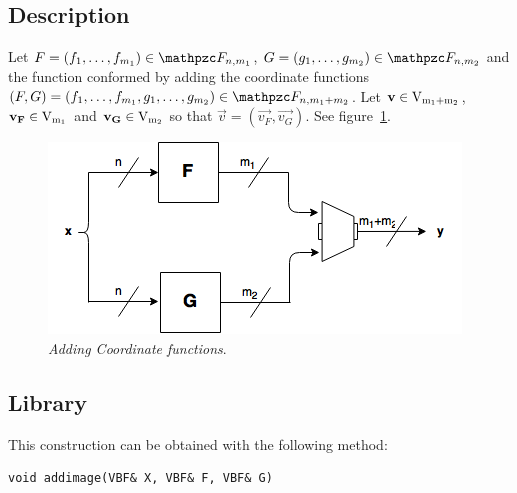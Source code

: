 \subsection{Description}

\begin{definition}
Let $F=(f_1,\ldots,f_{m_1}) \in \funct{F}_{n,m_1}$, $G=(g_1,\ldots,g_{m_2}) \in \funct{F}_{n,m_2}$ and the function conformed by adding the coordinate functions $(F,G) =(f_1,\dots,f_{m_1},g_1,\ldots,g_{m_2}) \in \funct{F}_{n,m_1+m_2}$. Let $\vec{v} \in \gf{V_{m_1+m_2}}$,$\vec{v_F} \in \gf{V_{m_1}}$ and $\vec{v_G} \in \gf{V_{m_2}}$ so that $\vec{v} = (\vec{v_F}, \vec{v_G})$. See figure~\ref{fig:AddImage}.
\end{definition}

\begin{figure}[htbp!]
\centering
\includegraphics{AddImage}
\caption[Adding Coordinate functions]{\textit{Adding Coordinate functions}.}
\label{fig:AddImage}
\end{figure}

\subsection{Library}

This construction can be obtained with the following method:

\begin{verbatim}
void addimage(VBF& X, VBF& F, VBF& G)  
\end{verbatim}

